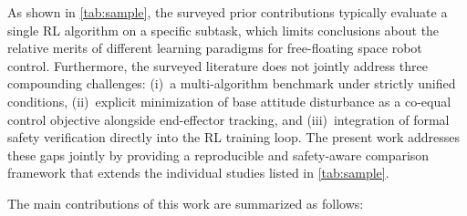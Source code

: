 \documentclass{ieeeaccess}
\begin{document}
As shown in \autoref{tab:sample}, the surveyed prior contributions typically evaluate a single RL algorithm
on a specific subtask, which limits conclusions about the relative merits of different learning
paradigms for free-floating space robot control. Furthermore, the surveyed literature does not jointly address
three compounding challenges: (i)~a multi-algorithm benchmark under strictly unified conditions, (ii)~explicit minimization of base
attitude disturbance as a co-equal control objective alongside end-effector tracking, and (iii)~integration of formal
safety verification directly into the RL training loop. The present work addresses these gaps
jointly by providing a reproducible and safety-aware comparison framework that extends the individual studies
listed in \autoref{tab:sample}.

The main contributions of this work are summarized as follows:
\end{document}
